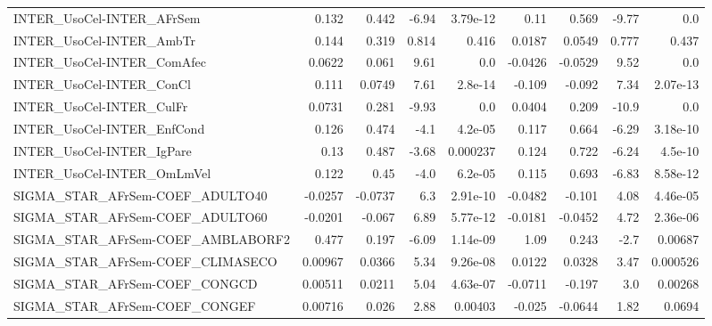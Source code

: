 \begin{tabular}{lrrrrrrrr}
INTER\_UsoCel-INTER\_AFrSem             &       0.132 &        0.442 &    -6.94 & 3.79e-12 &       0.11 &       0.569 &        -9.77 &           0.0 \\
INTER\_UsoCel-INTER\_AmbTr              &       0.144 &        0.319 &    0.814 &    0.416 &     0.0187 &      0.0549 &        0.777 &         0.437 \\
INTER\_UsoCel-INTER\_ComAfec            &      0.0622 &        0.061 &     9.61 &      0.0 &    -0.0426 &     -0.0529 &         9.52 &           0.0 \\
INTER\_UsoCel-INTER\_ConCl              &       0.111 &       0.0749 &     7.61 &  2.8e-14 &     -0.109 &      -0.092 &         7.34 &      2.07e-13 \\
INTER\_UsoCel-INTER\_CulFr              &      0.0731 &        0.281 &    -9.93 &      0.0 &     0.0404 &       0.209 &        -10.9 &           0.0 \\
INTER\_UsoCel-INTER\_EnfCond            &       0.126 &        0.474 &     -4.1 &  4.2e-05 &      0.117 &       0.664 &        -6.29 &      3.18e-10 \\
INTER\_UsoCel-INTER\_IgPare             &        0.13 &        0.487 &    -3.68 & 0.000237 &      0.124 &       0.722 &        -6.24 &       4.5e-10 \\
INTER\_UsoCel-INTER\_OmLmVel            &       0.122 &         0.45 &     -4.0 &  6.2e-05 &      0.115 &       0.693 &        -6.83 &      8.58e-12 \\
SIGMA\_STAR\_AFrSem-COEF\_ADULTO40       &     -0.0257 &      -0.0737 &      6.3 & 2.91e-10 &    -0.0482 &      -0.101 &         4.08 &      4.46e-05 \\
SIGMA\_STAR\_AFrSem-COEF\_ADULTO60       &     -0.0201 &       -0.067 &     6.89 & 5.77e-12 &    -0.0181 &     -0.0452 &         4.72 &      2.36e-06 \\
SIGMA\_STAR\_AFrSem-COEF\_AMBLABORF2     &       0.477 &        0.197 &    -6.09 & 1.14e-09 &       1.09 &       0.243 &         -2.7 &       0.00687 \\
SIGMA\_STAR\_AFrSem-COEF\_CLIMASECO      &     0.00967 &       0.0366 &     5.34 & 9.26e-08 &     0.0122 &      0.0328 &         3.47 &      0.000526 \\
SIGMA\_STAR\_AFrSem-COEF\_CONGCD         &     0.00511 &       0.0211 &     5.04 & 4.63e-07 &    -0.0711 &      -0.197 &          3.0 &       0.00268 \\
SIGMA\_STAR\_AFrSem-COEF\_CONGEF         &     0.00716 &        0.026 &     2.88 &  0.00403 &     -0.025 &     -0.0644 &         1.82 &        0.0694 \\

\end{tabular}
